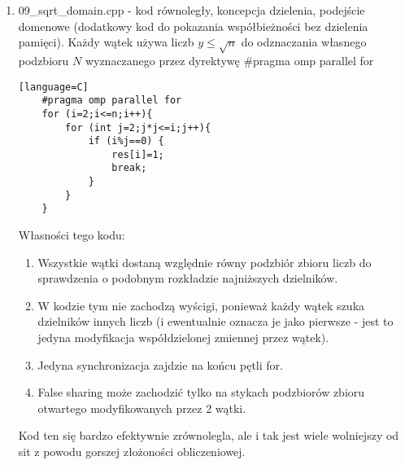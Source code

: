 \documentclass[12pt]{article}
\begin{document}
\begin {enumerate}
\begin{lstlisting}[style=mystyle, caption= Sito funkcyjne z dynamic schedulingiem][language=C]
	#pragma omp parallel
	{
		int thnum=omp_get_thread_num(), allth=omp_get_num_threads();
		int left=a+((n-a)/allth)*thnum, i, ji, j, finished=0, curfun=left;
		int right=left+(n-a)/allth-1;
		if (thnum==allth-1) right=n;
		if (left<=sq) left=sq+1;
		
		while (finished<ineo){
			curfun=curfun+outer;
			for (ji=0;ji<ineo;ji++){
				i=neoprimez[ji];
				if (dp[thnum][i]==0) dp[thnum][i]=max(modal(left, i), modal(a, i));
				for (j=dp[thnum][i]; j<=right;j+=i){
					if (j>=curfun) break;
					p[j]=1;	
				}
				if (j>right) finished++;
				dp[thnum][i]=j;
			}
		}
	}
\end{lstlisting}
Jedyną fundamentalną różnicą pomiędzy tym kodem a zwykłym sitem domenowym jest unikanie cache missów i dążenie do trzymania w L1 cache jak największej części aktualnie używanego sita. Poza tym złożoność może się zwiększyć, a przynajmniej nie jestem w stanie dowieść standardowej złożoności sita. To rozwiązanie pozwala efektywnie zrównoleglić zadanie, co pokażą wyniki VTune'a.

	\item 09\_sqrt\_domain.cpp - kod równoległy, koncepcja dzielenia, podejście domenowe (dodatkowy kod do pokazania współbieżności bez dzielenia pamięci). Każdy wątek używa liczb \(y\le\sqrt{n}\) do odznaczania własnego podzbioru \(N\) wyznaczanego przez dyrektywę \#pragma omp parallel for
	\begin{lstlisting}[style=mystyle, caption= Sito funkcyjne z dynamic schedulingiem][language=C]
	#pragma omp parallel for
	for (i=2;i<=n;i++){
		for (int j=2;j*j<=i;j++){
			if (i%j==0) {
				res[i]=1;
				break;
			}
		}
	}
	\end{lstlisting}
	Własności tego kodu:
	\begin{enumerate}
		\item Wszystkie wątki dostaną względnie równy podzbiór zbioru liczb do sprawdzenia o podobnym rozkładzie najniższych dzielników.
		\item W kodzie tym nie zachodzą wyścigi, ponieważ każdy wątek szuka dzielników innych liczb (i ewentualnie oznacza je jako pierwsze - jest to jedyna modyfikacja współdzielonej zmiennej przez wątek).
		\item Jedyna synchronizacja zajdzie na końcu pętli for.
		\item False sharing może zachodzić tylko na stykach podzbiorów zbioru otwartego modyfikowanych przez 2 wątki.
	\end{enumerate}
	Kod ten się bardzo efektywnie zrównolegla, ale i tak jest wiele wolniejszy od sit z powodu gorszej złożoności obliczeniowej.
\end {enumerate}
\end{document}
